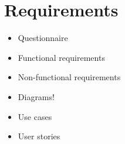 \section{Requirements}

\begin{itemize}
    \item Questionnaire
    \item Functional requirements
    \item Non-functional requirements
    \item Diagrams!
    \item Use cases
    \item User stories
\end{itemize}
